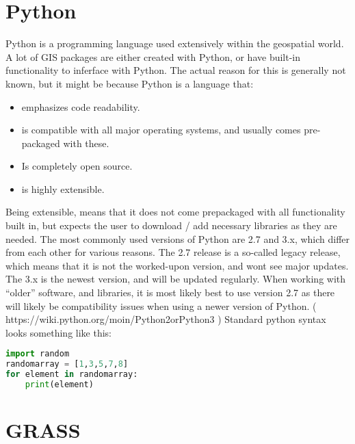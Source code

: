 
\section{Python}\label{sec:issues}

Python is a programming language used extensively within the geospatial world. A lot of GIS packages are either created with Python, or have built-in functionality to inferface with Python. The actual reason for this is generally not known, but it might be because Python is a language that:
\begin{itemize}
\item emphasizes code readability.
\item is compatible with all major operating systems, and usually comes pre-packaged with these. 
\item Is completely open source. 
\item is highly extensible. 
\end{itemize}
Being extensible, means that it does not come prepackaged with all functionality built in, but expects the user to download / add necessary libraries as they are needed. 
The most commonly used versions of Python are 2.7 and 3.x, which differ from each other for various reasons. The 2.7 release is a so-called legacy release, which means that it is not the worked-upon version, and wont see major updates. The 3.x is the newest version, and will be updated regularly. When working with “older” software, and libraries, it is most likely best to use version 2.7 as there will likely be compatibility issues when using a newer version of Python. ( https://wiki.python.org/moin/Python2orPython3 )
Standard python syntax looks something like this:\\

\begin{lstlisting}[language=Python]
import random
randomarray = [1,3,5,7,8]
for element in randomarray:
	print(element)
\end{lstlisting}

\section{GRASS}


